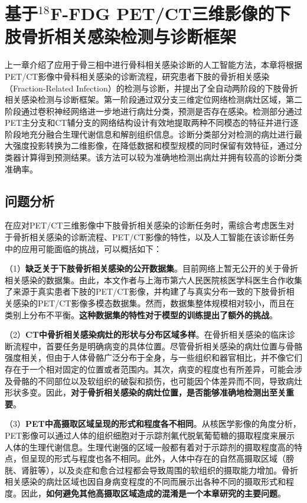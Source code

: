 \chapter{基于\texorpdfstring{\(^{18}\)}{18}F-FDG PET/CT三维影像的下肢骨折相关感染检测与诊断框架}

上一章介绍了应用于骨三相中进行骨科相关感染诊断的人工智能方法，本章将根据PET/CT影像中骨科相关感染的诊断流程，研究患者下肢的骨折相关感染（Fraction-Related Infection）的检测与诊断，并提出了全自动两阶段的下肢骨折相关感染检测与诊断框架。第一阶段通过双分支三维定位网络检测病灶区域，第二阶段通过卷积神经网络进一步地进行病灶分类，预测是否存在感染。检测部分通过PET主分支和CT辅分支的网络结构设计有效地提取两种不同模态的特征并进行逐阶段地充分融合生理代谢信息和解剖组织信息。诊断分类部分对检测的病灶进行最大强度投影转换为二维影像，在降低数据和模型规模的同时保留有效特征，通过分类器计算得到预测结果。该方法可以较为准确地检测出病灶并拥有较高的诊断分类准确率。

\section{问题分析}


在应对PET/CT三维影像中下肢骨折相关感染的诊断任务时，需综合考虑医生对于骨折相关感染的诊断流程、PET/CT影像的特性，以及人工智能在该诊断任务中的应用可能面临的挑战，可以概括如下：

（1）\textbf{缺乏关于下肢骨折相关感染的公开数据集}。目前网络上暂无公开的关于骨折相关感染的数据集。由此，本文作者与上海市第六人民医院核医学科医生合作收集了来源于真实患者下肢的PET/CT影像，并构建了与真实分布一致的下肢骨折相关感染的PET/CT影像多模态数据集。然而，数据集整体规模相对较小，而且在类别上分布不平衡。\textbf{这种数据集的特性对于模型的训练提出了额外的挑战}。

（2）\textbf{CT中骨折相关感染病灶的形状与分布区域多样}。在骨折相关感染的临床诊断流程中，首要任务是明确病变的具体位置。尽管骨折相关感染的病灶位置与骨骼强度相关，但由于人体骨骼广泛分布于全身，与一些组织和器官相比，并不像它们存在于一个相对固定的位置或者范围内。其次，病变的程度也有所差异，可能会涉及骨骼的不同部位以及软组织的破裂和损伤，也可能因个体差异而不同，导致病灶形状多变。因此，\textbf{对于骨折相关感染的病灶位置，是否能够准确地检测出至关重要}。

（3）\textbf{PET中高摄取区域呈现的形式和程度各不相同}。从核医学影像的角度分析，PET影像可以通过人体的组织细胞对于示踪剂氟代脱氧葡萄糖的摄取程度来展示人体的生理代谢信息。生理代谢强的区域一般都有着对于示踪剂的摄取程度高的特点，但呈现的形式与程度也各不相同。此外，人体中存在的自然高摄取区域（膀胱、肾脏等），以及炎症和愈合过程都会导致周围的软组织的摄取能力增加。骨折相关感染的病灶区域也因自身病变程度的不同而展示出各种不同的摄取形式和程度。因此，\textbf{如何避免其他高摄取区域造成的混淆是一个本章研究的主要问题}。

